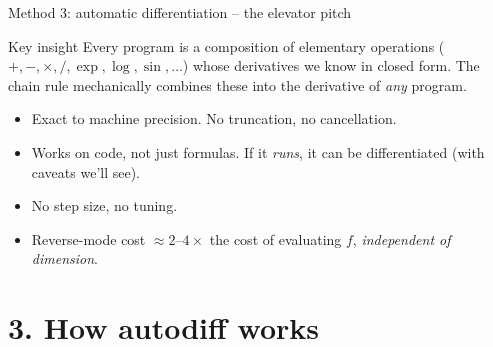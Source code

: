 \documentclass[aspectratio=169,11pt]{beamer}
\newcommand{\emphc}[1]{\textcolor{harvardcrimson}{#1}}
\begin{document}
\begin{frame}{Method 3: automatic differentiation -- the elevator pitch}
\small
\begin{block}{Key insight}
Every program is a composition of \emphc{elementary operations} ($+,-,\times,/,\exp,\log,\sin,\ldots$) whose derivatives we know in closed form. The chain rule mechanically combines these into the derivative of \emph{any} program.
\end{block}
\vspace{4pt}
\begin{center}
\end{center}
\vspace{2pt}
\begin{itemize}\itemsep3pt
\item \emphc{Exact to machine precision.} No truncation, no cancellation.
\item \emphc{Works on code}, not just formulas. If it \emph{runs}, it can be differentiated (with caveats we'll see).
\item \emphc{No step size}, no tuning.
\item \emphc{Reverse-mode cost} $\approx 2$--$4\times$ the cost of evaluating $f$, \emph{independent of dimension}.
\end{itemize}
\end{frame}


\section*{3. How autodiff works}
\end{document}
